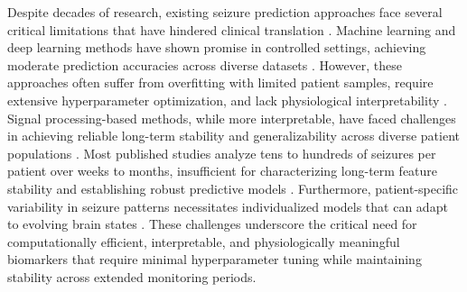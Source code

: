Despite decades of research, existing seizure prediction approaches face several critical limitations that have hindered clinical translation \cite{Iasemidis2003EpilepticSPS,Natu2022ReviewOEB,Talukder2023ComparativeAOM,Assi2017TowardsAPF}. Machine learning and deep learning methods have shown promise in controlled settings, achieving moderate prediction accuracies across diverse datasets \cite{Truong2021SeizureSPV,Dissanayake2020PatientindependentESY,KiralKornek2017EpilepticSPW,kiralkornek2018103,Messaoud2021RandomFCR,Rong2020ArtificialIID}. However, these approaches often suffer from overfitting with limited patient samples, require extensive hyperparameter optimization, and lack physiological interpretability \cite{Usman2017EpilepticSPH,Hussein2022MultiChannelVTE,Chu2017PredictingESK,Moghim2014PredictingESAF}. Signal processing-based methods, while more interpretable, have faced challenges in achieving reliable long-term stability and generalizability across diverse patient populations \cite{Namazi2015ASPAZ}. Most published studies analyze tens to hundreds of seizures per patient over weeks to months, insufficient for characterizing long-term feature stability and establishing robust predictive models \cite{Kuhlmann2018SeizurePA,karoly2016interictal,DAlessandro2003EpilepticSPQ}. Furthermore, patient-specific variability in seizure patterns necessitates individualized models that can adapt to evolving brain states \cite{Aldahr2023PatientSpecificPPL,Pinto2021APAP}. These challenges underscore the critical need for computationally efficient, interpretable, and physiologically meaningful biomarkers that require minimal hyperparameter tuning while maintaining stability across extended monitoring periods.

